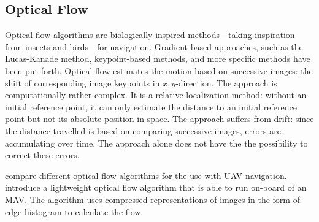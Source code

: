 
\subsection{Optical Flow}
\label{sec:opticalflow}

Optical flow algorithms are biologically inspired methods---taking inspiration from insects and birds---for navigation. Gradient based approaches, such as the Lucas-Kanade method, keypoint-based methods, and more specific methods have been put forth.  
Optical flow estimates the motion based on successive images: the shift of corresponding image keypoints in $x,y$-direction.
The approach is computationally rather complex. It is a relative localization method: without an initial reference point, it can only estimate the distance to an initial reference point but not its absolute position in space. The approach suffers from drift: since the distance travelled is based on comparing successive images, errors are accumulating over time. The approach alone does not have the  the possibility to correct these errors.

\citet{chao2013survey} compare different optical flow algorithms for the use with UAV navigation. \citet{mcguire2016local} introduce a lightweight optical flow algorithm that is able to run on-board of an MAV. The algorithm uses compressed representations of images in the form of edge histogram to calculate the flow.   